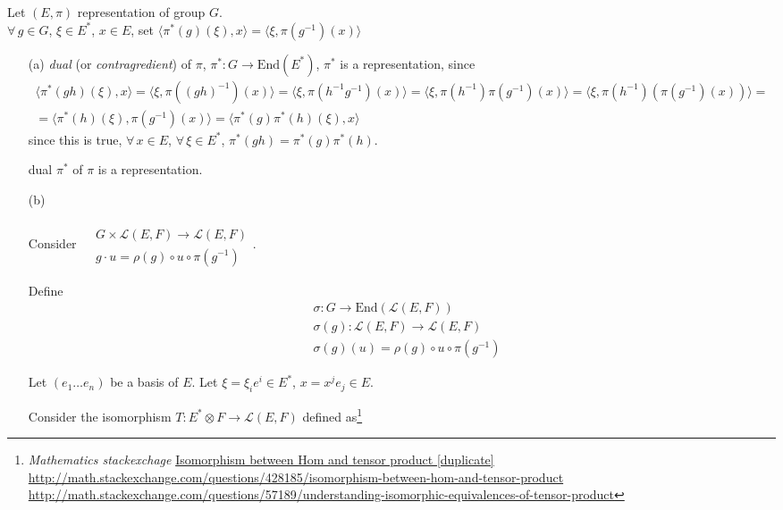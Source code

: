 Let $(E,\pi)$ representation of group $G$.  \\
$\forall \, g \in G$, $\xi \in E^*$, $x\in E$, set $\langle \pi^*(g)(\xi), x \rangle = \langle \xi, \pi(g^{-1})(x) \rangle$
\begin{enumerate}
	\item[(a)] \emph{dual} (or \emph{contragredient}) of $\pi$, $\pi^*:G \to \text{End}(E^*)$, $\pi^*$ is a representation, since
	\[
	\begin{gathered}
	\langle \pi^*(gh)(\xi),x\rangle = \langle \xi, \pi((gh)^{-1})(x) \rangle = \langle \xi, \pi(h^{-1}g^{-1})(x) \rangle = \langle \xi, \pi(h^{-1}) \pi(g^{-1})(x) \rangle = \langle \xi, \pi(h^{-1}) (\pi(g^{-1})(x)) \rangle =  \\
	= \langle \pi^*(h)(\xi), \pi(g^{-1})(x) \rangle = \langle \pi^*(g)\pi^*(h)(\xi), x \rangle
	\end{gathered}
	\]
	since this is true, $\forall \, x \in E$, $\forall \, \xi \in E^*$, $\pi^*(gh) = \pi^*(g)\pi^*(h)$.  
	
	dual $\pi^*$ of $\pi$ is a representation.  
	
	\item[(b)]
	
	Consider $\begin{aligned} & \quad \\
	& G \times \mathcal{L}(E,F) \to \mathcal{L}(E,F) \\
	& g\cdot u = \rho(g) \circ u \circ \pi(g^{-1}) \end{aligned}$.  
	
	Define 
	\[
	\begin{aligned}
	& \sigma : G \to \text{End}(\mathcal{L}(E,F)) \\ 
	& \sigma(g):\mathcal{L}(E,F) \to \mathcal{L}(E,F) \\  
	& \sigma(g)(u) = \rho(g)\circ u \circ \pi(g^{-1})
	\end{aligned}
	\]
	
	Let $(e_1 \dots e_n)$ be a basis of $E$.  Let $\xi = \xi_i e^i \in E^*$, $x = x^j e_j \in E$.  
	
	Consider the isomorphism $T: E^*\otimes F \to \mathcal{L}(E,F)$ defined as\footnote{\emph{Mathematics stackexchage} \href{http://math.stackexchange.com/questions/428185/isomorphism-between-hom-and-tensor-product}{Isomorphism between Hom and tensor product [duplicate]} \url{http://math.stackexchange.com/questions/428185/isomorphism-between-hom-and-tensor-product} \\ \url{http://math.stackexchange.com/questions/57189/understanding-isomorphic-equivalences-of-tensor-product}}
	

\end{enumerate}
